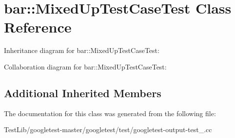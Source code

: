 \hypertarget{classbar_1_1MixedUpTestCaseTest}{}\section{bar\+:\+:Mixed\+Up\+Test\+Case\+Test Class Reference}
\label{classbar_1_1MixedUpTestCaseTest}


Inheritance diagram for bar\+:\+:Mixed\+Up\+Test\+Case\+Test\+:


Collaboration diagram for bar\+:\+:Mixed\+Up\+Test\+Case\+Test\+:
\subsection*{Additional Inherited Members}


The documentation for this class was generated from the following file\+:\begin{DoxyCompactItemize}
\item 
Test\+Lib/googletest-\/master/googletest/test/googletest-\/output-\/test\+\_\+.\+cc\end{DoxyCompactItemize}
